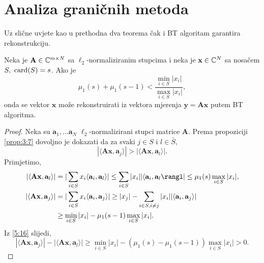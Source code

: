 \documentclass[a4paper,twoside,12pt]{memoir} %
\newcommand{\vect}[1]{\mathbf{#1}}
\renewcommand{\vec}{\vect}
\newcommand{\card}{\text{\normalfont{card}}}
\begin{document}
\section[Analiza grani\v{c}nih metoda][Analiza grani\v{c}nih metoda]{Analiza grani\v{c}nih metoda}
Uz sli\v{c}ne uvjete kao u prethodna dva teorema \v{c}ak i BT algoritam garantira rekonstrukciju.
\begin{thm}\label{tm:5:16}
    Neka je $\vec A \in \C^{m \times N}$ sa $\ell_2$-normaliziranim stupcima i neka je $\vec x \in \C^N$ sa nosa\v{c}em $S,\ \card(S) = s$. Ako je 
    \begin{equation}\label{5:16}
        \mu_1(s) + \mu_1(s-1) < \frac{\min_{i \in S}|x_i|}{\max_{i \in S}|x_i|}, 
    \end{equation}
    onda se vektor $\vec x$ mo\v{z}e rekonstruirati iz vektora mjerenja $\vec y = \vec{Ax}$ putem BT algoritma.
\end{thm}
\begin{proof}
    Neka su $\vec a_1, \dots \vec a_N$ $\ell_2$-normalizirani stupci matrice $\vec A$. Prema propoziciji \ref{prop:3:7} dovoljno je dokazati da za svaki $j \in S$ i $l \in \bar S$,
    \begin{equation}\label{5:17}
        |\langle \vec{Ax}, \vec a_j \rangle| >  |\langle \vec{Ax}, \vec a_l \rangle|.
    \end{equation}
    Primjetimo,
    \begin{align*}
        |\langle \vec{Ax}, \vec a_l \rangle| &= |\sum_{i \in S} x_i \langle \vec a_i, \vec a_l\rangle| \leq \sum_{i \in S} |x_i||\langle \vec a_i, \vec a_l \rangl| \leq \mu_1(s) \max_{i \in S} |x_i|,\\
        |\langle \vec{Ax}, \vec a_j \rangle| &=|\sum_{i \in S} x_i \langle \vec a_i, \vec a_j\rangle| \geq |x_j| - \sum_{i \in S, i \neq j}|x_i||\langle \vec a_i, \vec a_j \rangle| \\
        &\geq \min_{i \in S} |x_i| - \mu_1(s-1)\max_{i \in S}|x_i|.
    \end{align*}
    Iz \eqref{5:16} slijedi,
    \begin{equation*}
        |\langle \vec{Ax}, \vec{a}_j \rangle| - |\langle \vec{Ax}, \vec{a}_l \rangle| \geq \min_{i \in S}|x_i| - (\mu_1(s) - \mu_1(s-1))\max_{i \in S} |x_i| > 0.
    \end{equation*}
\end{proof}
\end{document}
